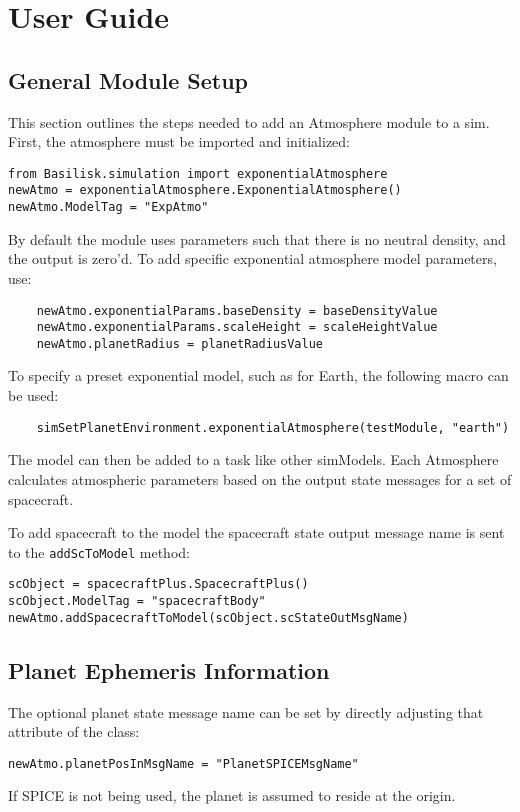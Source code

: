 
\section{User Guide}

\subsection{General Module Setup}
This section outlines the steps needed to add an Atmosphere module to a sim.
First, the atmosphere must be imported and initialized:
\begin{verbatim}
from Basilisk.simulation import exponentialAtmosphere
newAtmo = exponentialAtmosphere.ExponentialAtmosphere()
newAtmo.ModelTag = "ExpAtmo"
\end{verbatim}
By default the module uses parameters such that there is no neutral density, and the output is zero'd.  To add specific exponential atmosphere model parameters, use:
\begin{verbatim}
    newAtmo.exponentialParams.baseDensity = baseDensityValue
    newAtmo.exponentialParams.scaleHeight = scaleHeightValue
    newAtmo.planetRadius = planetRadiusValue
\end{verbatim}
To specify a preset exponential model, such as for Earth, the following macro can be used:
\begin{verbatim}
	simSetPlanetEnvironment.exponentialAtmosphere(testModule, "earth")
\end{verbatim}

The model can then be added to a task like other simModels. Each Atmosphere calculates atmospheric parameters based on the output state messages for a set of spacecraft.

To add spacecraft to the model the spacecraft state output message name is sent to the \verb|addScToModel| method:
\begin{verbatim}
scObject = spacecraftPlus.SpacecraftPlus()
scObject.ModelTag = "spacecraftBody"
newAtmo.addSpacecraftToModel(scObject.scStateOutMsgName)
\end{verbatim}

\subsection{Planet Ephemeris Information}
The optional planet state message name can be set by directly adjusting that attribute of the class:
\begin{verbatim}
newAtmo.planetPosInMsgName = "PlanetSPICEMsgName"
\end{verbatim}
If SPICE is not being used, the planet is assumed to reside at the origin.

